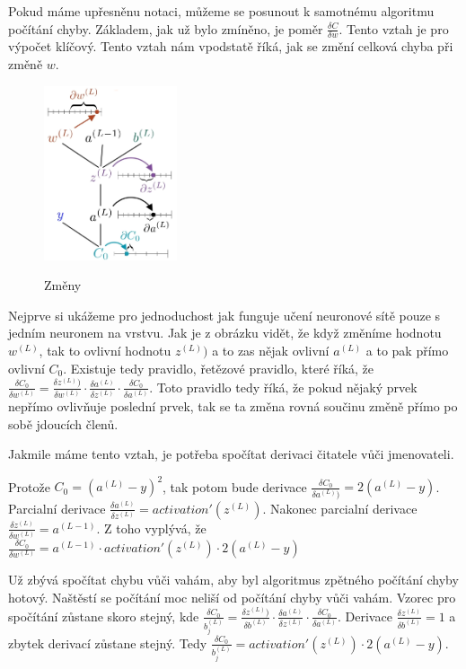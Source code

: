 Pokud máme upřesněnu notaci, můžeme se posunout k samotnému algoritmu počítání chyby.
Základem, jak už bylo zmíněno, je poměr \(\frac{\delta C}{\delta w}\). Tento vztah je pro výpočet klíčový.
Tento vztah nám vpodstatě říká, jak se změní celková chyba při změně \(w\).

\begin{figure}[h]
    \centering
    \includegraphics[width=0.35\textwidth]{images/delta.png}
    \caption{Změny} \cite{delta}
\end{figure}

Nejprve si ukážeme pro jednoduchost jak funguje učení neuronové sítě pouze s jedním neuronem na vrstvu. Jak je z obrázku vidět, že když změníme hodnotu \(w^{(L)}\), tak to ovlivní hodnotu \(z^{(L)})\) a to zas nějak ovlivní \(a^{(L)}\) a to pak přímo ovlivní \(C_0\).
Existuje tedy pravidlo, řetězové pravidlo\cite{chain_rule}, které říká, že \(\frac{\delta C_0}{\delta w^{(L)}} = \frac{\delta z^{(L)})}{\delta w^{(L)}} \cdot \frac{\delta a^{(L)}}{\delta z^{(L)}} \cdot \frac{\delta C_0}{\delta a^{(L)}}\).
Toto pravidlo tedy říká, že pokud nějaký prvek nepřímo ovlivňuje poslední prvek, tak se ta změna rovná součinu změně přímo po sobě jdoucích členů.

Jakmile máme tento vztah, je potřeba spočítat derivaci čitatele vůči jmenovateli.

Protože \(C_0 = (a^{(L)} - y)^2\), tak potom bude derivace \(\frac{\delta C_0}{\delta a^{(L)})}= 2(a^{(L)} - y)\).
Parcialní derivace \(\frac{\delta a^{(L)}}{\delta z^{(L)}} = activation'(z^{(L)}) \).
Nakonec parcialní derivace \(\frac{\delta z^{(L)}}{\delta w^{(L)}} = a^{(L-1)}\).
Z toho vyplývá, že \(\frac{\delta C_0}{\delta w^{(L)}} = a^{(L-1)} \cdot activation'(z^{(L)}) \cdot 2(a^{(L)} - y)\)

Už zbývá spočítat chybu vůči vahám, aby byl algoritmus zpětného počítání chyby hotový.
Naštěstí se počítání moc neliší od počítání chyby vůči vahám.
Vzorec pro spočítání zůstane skoro stejný, kde \(\frac{\delta C_0}{b_j^{(L)}} = \frac{\delta z^{(L)})}{\delta b^{(L)}} \cdot \frac{\delta a^{(L)}}{\delta z^{(L)}} \cdot \frac{\delta C_0}{\delta a^{(L)}} \).
Derivace \(\frac{\delta z^{(L)}}{\delta b^{(L)}} = 1 \) a zbytek derivací zůstane stejný. Tedy \(\frac{\delta C_0}{b_j^{(L)}} =  activation'(z^{(L)}) \cdot 2(a^{(L)} - y)\).

